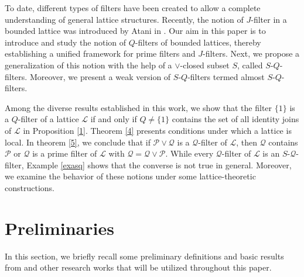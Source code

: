 \documentclass[preprint,review,10pt]{amsart}
\theoremstyle{definition}
\theoremstyle{remark}
\numberwithin{equation}{section}
\begin{document}
 To date, different types of filters have been created to allow a complete understanding of general lattice structures. Recently, the notion of $J$-filter in a bounded lattice was introduced by Atani in \cite{Atani6}. Our aim in this paper is to introduce and
study the notion of $Q$-filters of bounded lattices, 
thereby establishing   a unified framework for prime filters and $J$-filters. Next, we propose a generalization of  this notion with the help of a $\vee$-closed subset $S$, called  $S$-$Q$-filters. Moreover, we present a weak version of $S$-$Q$-filters termed almost $S$-$Q$-filters.


 Among the diverse results established in this work, we show that the filter $\{1\}$ is a $Q$-filter of a lattice $\mathcal{L}$ if and only if $Q \neq \{1\}$ contains the set of all identity joins of $\mathcal{L}$ in Proposition \ref{1}.   Theorem \ref{4} presents conditions under which a lattice is local. In theorem \ref{5}, we conclude that if $\mathcal{P} \vee \mathcal{Q}$ is a $\mathcal{Q}$-filter of $\mathcal{L}$, then  $ \mathcal{Q}$ contains $\mathcal{P}$ or $\mathcal{Q}$ is a prime filter of $\mathcal{L}$ with $\mathcal{Q}=\mathcal{Q} \vee \mathcal{P}.$ While every $\mathcal{Q}$-filter of $\mathcal{L}$ is an $S$-$\mathcal{Q}$-filter, Example \ref{exasq} shows that the converse is not true in general. Moreover, we examine the behavior of
these notions  under some lattice-theoretic constructions. 
 
 
 


\section{Preliminaries}
In this section, we briefly recall some preliminary definitions and basic results  from \cite{Birkhoff} and other research works that will be utilized throughout this paper.
\end{document}

